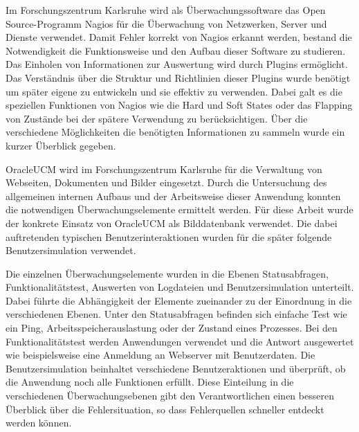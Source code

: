 Im Forschungszentrum Karlsruhe wird als Überwachungssoftware das Open Source-Programm Nagios für die Überwachung von Netzwerken, Server und Dienste verwendet.
Damit Fehler korrekt von Nagios erkannt werden, bestand die Notwendigkeit die Funktionsweise und den Aufbau dieser Software zu studieren.
Das Einholen von Informationen zur Auswertung wird durch Plugins ermöglicht.
Das Verständnis über die Struktur und Richtlinien dieser Plugins wurde benötigt um später eigene zu entwickeln und sie effektiv zu verwenden.
Dabei galt es die speziellen Funktionen von Nagios wie die Hard und Soft States oder das Flapping von Zustände bei der spätere Verwendung zu berücksichtigen.
Über die verschiedene Möglichkeiten die benötigten Informationen zu sammeln wurde ein kurzer Überblick gegeben.

\gls{OracleUCM} wird im Forschungszentrum Karlsruhe für die Verwaltung von Webseiten, Dokumenten und Bilder eingesetzt.
Durch die Untersuchung des allgemeinen internen Aufbaus und der Arbeitsweise dieser Anwendung konnten die notwendigen Überwachungselemente ermittelt werden.
Für diese Arbeit wurde der konkrete Einsatz von \gls{OracleUCM} als Bilddatenbank verwendet.
Die dabei auftretenden typischen Benutzerinteraktionen wurden für die später folgende Benutzersimulation verwendet.

Die einzelnen Überwachungselemente wurden in die Ebenen Statusabfragen, Funktionalitätstest, Auswerten von Logdateien und Benutzersimulation unterteilt.
Dabei führte die Abhängigkeit der Elemente zueinander zu der Einordnung in die verschiedenen Ebenen.
Unter den Statusabfragen befinden sich einfache Test wie ein Ping, Arbeitsspeicherauslastung oder der Zustand eines Prozesses.
Bei den Funktionalitätstest werden Anwendungen verwendet und die Antwort ausgewertet wie beispielsweise eine Anmeldung an Webserver mit Benutzerdaten.
Die Benutzersimulation beinhaltet verschiedene Benutzeraktionen und überprüft, ob die Anwendung noch alle Funktionen erfüllt.
Diese Einteilung in die verschiedenen Überwachungsebenen gibt den Verantwortlichen einen besseren Überblick über die Fehlersituation, so dass Fehlerquellen schneller entdeckt werden können.

